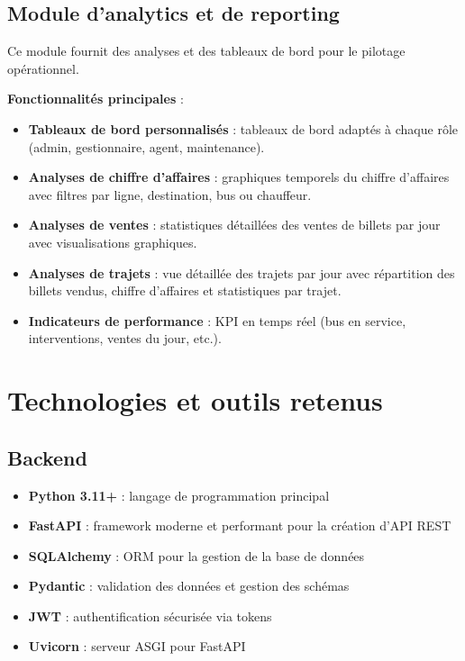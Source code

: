 \documentclass[a4paper, 12pt]{book}
\begin{document}
\subsection{Module d'analytics et de reporting}

Ce module fournit des analyses et des tableaux de bord pour le pilotage opérationnel.

\textbf{Fonctionnalités principales} :
\begin{itemize}
    \item \textbf{Tableaux de bord personnalisés} : tableaux de bord adaptés à chaque rôle (admin, gestionnaire, agent, maintenance).
    \item \textbf{Analyses de chiffre d'affaires} : graphiques temporels du chiffre d'affaires avec filtres par ligne, destination, bus ou chauffeur.
    \item \textbf{Analyses de ventes} : statistiques détaillées des ventes de billets par jour avec visualisations graphiques.
    \item \textbf{Analyses de trajets} : vue détaillée des trajets par jour avec répartition des billets vendus, chiffre d'affaires et statistiques par trajet.
    \item \textbf{Indicateurs de performance} : KPI en temps réel (bus en service, interventions, ventes du jour, etc.).
\end{itemize}

\section{Technologies et outils retenus}

\subsection{Backend}
\begin{itemize}
    \item \textbf{Python 3.11+} : langage de programmation principal
    \item \textbf{FastAPI} : framework moderne et performant pour la création d'API REST
    \item \textbf{SQLAlchemy} : ORM pour la gestion de la base de données
    \item \textbf{Pydantic} : validation des données et gestion des schémas
    \item \textbf{JWT} : authentification sécurisée via tokens
    \item \textbf{Uvicorn} : serveur ASGI pour FastAPI
\end{itemize}
\end{document}
